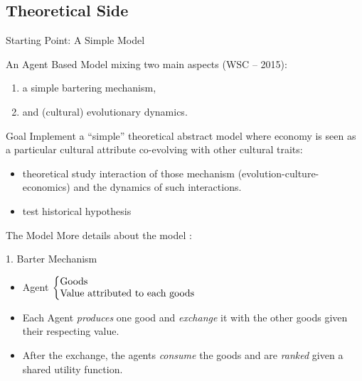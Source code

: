 \documentclass[8pt, handout=show,notes=show]{beamer}
\begin{document}
\subsection{Theoretical Side}
\begin{frame}{Starting Point: A Simple Model}

	An Agent Based Model mixing two main aspects (WSC -- 2015):

	\vfil
	\begin{enumerate}
		\item a	simple bartering mechanism,
		\item and (cultural) evolutionary dynamics.
	\end{enumerate}

	\vfill
	\begin{alertblock}{Goal}
	    Implement a ``simple'' theoretical abstract model where economy is seen as a particular cultural attribute co-evolving with other cultural traits:
	    \begin{itemize}
		\item theoretical study interaction of those mechanism (evolution-culture-economics) and the dynamics of such interactions.
		\item test historical hypothesis
	    \end{itemize}
	\end{alertblock}

\end{frame}



	
\begin{frame}{The Model}
    More details about the model : 
    \vfill
	\begin{block}{1. Barter Mechanism}
	    \begin{itemize}
		\item Agent 
		    $\left\{
			\begin{tabular}{@{}l@{}}
			    Goods \\
			    Value attributed to each goods\\
			\end{tabular}
			\right.$
		    \item Each Agent \emph{produces} one good and \emph{exchange} it with the other goods given their respecting value.
		    \item After the exchange, the agents \emph{consume} the goods and are \emph{ranked} given a shared utility function.
		\end{itemize}

	\end{block}
\end{frame}
\end{document}
